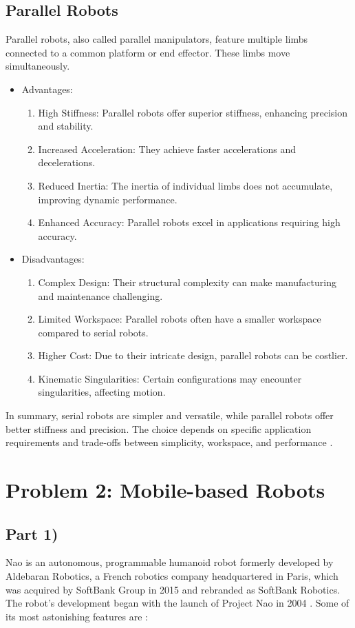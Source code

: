 \documentclass[conference]{IEEEtran}
\begin{document}
\subsection{Parallel Robots}
Parallel robots, also called parallel manipulators, feature multiple limbs connected to a common platform or end effector. These limbs move simultaneously.
\begin{itemize}
    \item Advantages:
    \begin{enumerate}
        \item High Stiffness: Parallel robots offer superior stiffness, enhancing precision and stability.
        \item Increased Acceleration: They achieve faster accelerations and decelerations.
        \item Reduced Inertia: The inertia of individual limbs does not accumulate, improving dynamic performance.
        \item Enhanced Accuracy: Parallel robots excel in applications requiring high accuracy.
    \end{enumerate}
    \item Disadvantages:
    \begin{enumerate}
        \item Complex Design: Their structural complexity can make manufacturing and maintenance challenging.
        \item Limited Workspace: Parallel robots often have a smaller workspace compared to serial robots.
        \item Higher Cost: Due to their intricate design, parallel robots can be costlier.
        \item Kinematic Singularities: Certain configurations may encounter singularities, affecting motion.
    \end{enumerate}
\end{itemize}

In summary, serial robots are simpler and versatile, while parallel robots offer better stiffness and precision. The choice depends on specific application requirements and trade-offs between simplicity, workspace, and performance \cite{b2}\cite{b3}\cite{b4}. 

\vspace{10px}
\section{Problem 2: Mobile-based Robots}
\subsection*{Part 1)}
Nao is an autonomous, programmable humanoid robot formerly developed by Aldebaran Robotics, a French robotics company headquartered in Paris, which was acquired by SoftBank Group in 2015 and rebranded as SoftBank Robotics. The robot's development began with the launch of Project Nao in 2004 \cite{b5}. Some of its most astonishing features are \cite{b6}\cite{b7}:
\end{document}
